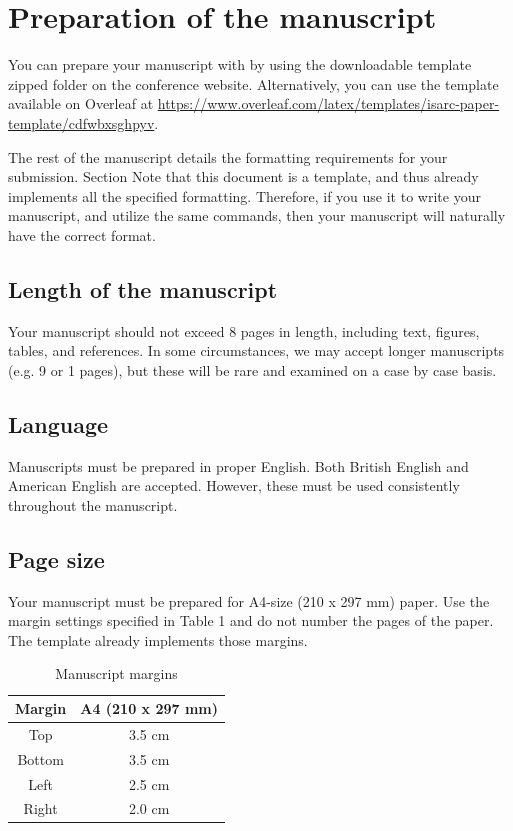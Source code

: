 \documentclass[a4paper, times, 10pt, twocolumn, twoside]{article}
\begin{document}
\section{Preparation of the manuscript}
\label{sec:Preparation}


You can prepare your manuscript with  by using the downloadable template zipped folder on the conference website.
Alternatively, you can use the  template available on Overleaf at \url{https://www.overleaf.com/latex/templates/isarc-paper-template/cdfwbxsghpyv}.

The rest of the manuscript details the formatting requirements for your submission.
Section 
Note that this document is a template, and thus already implements all the specified formatting. 
Therefore, if you use it to write your manuscript, and utilize the same commands, then your manuscript will naturally have the correct format. 

\subsection{Length of the manuscript}

Your manuscript should not exceed 8 pages in length, including text, figures, tables, and references.
In some circumstances, we may accept longer manuscripts (e.g. 9 or 1 pages), but these will be rare and examined on a case by case basis.

\subsection{Language}

Manuscripts must be prepared in proper English. Both British English and American English are accepted. However, these must be used consistently throughout the manuscript.

\subsection{Page size}

Your manuscript must be prepared for A4-size (210 x 297 mm) paper. 
Use the margin settings specified in Table 1 and do not number the pages of the paper.
The  template already implements those margins.

\begin{table}[htbp]
\centering
\caption{Manuscript margins}
\begin{tabular}{cc}
\hline
Margin	&A4 (210 x 297 mm)\\
\hline
Top		&3.5 cm\\
Bottom	&3.5 cm\\
Left	&2.5 cm\\
Right	&2.0 cm\\
\hline
\end{tabular}
\end{table}
\end{document}
